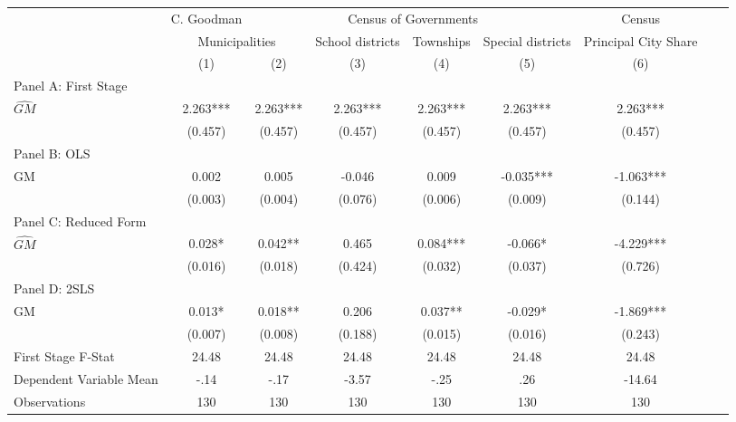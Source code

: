  \begin{tabular}{l*{8}{c}} \toprule
&\multicolumn{1}{c}{C. Goodman}&\multicolumn{4}{c}{Census of Governments}&\multicolumn{1}{c}{Census}\\\cmidrule(lr){2-2}\cmidrule(lr){3-6}\cmidrule(lr){7-7}
&\multicolumn{2}{c}{Municipalities}&\multicolumn{1}{c}{School districts}&\multicolumn{1}{c}{Townships}&\multicolumn{1}{c}{Special districts}&\multicolumn{1}{c}{Principal City Share}\\\cmidrule(lr){2-3}\cmidrule(lr){4-6}\cmidrule(lr){7-7}
&\multicolumn{1}{c}{(1)}&\multicolumn{1}{c}{(2)}&\multicolumn{1}{c}{(3)}&\multicolumn{1}{c}{(4)}&\multicolumn{1}{c}{(5)}&\multicolumn{1}{c}{(6)}\\
\cmidrule(lr){1-7}
\multicolumn{6}{l}{Panel A: First Stage}\\
\cmidrule(lr){1-7}
$\widehat{GM}$  &    2.263***&    2.263***&    2.263***&    2.263***&    2.263***&    2.263***\\
                &  (0.457)   &  (0.457)   &  (0.457)   &  (0.457)   &  (0.457)   &  (0.457)   \\
\cmidrule(lr){1-7}
\multicolumn{6}{l}{Panel B: OLS}\\
\cmidrule(lr){1-7}
GM              &    0.002   &    0.005   &   -0.046   &    0.009   &   -0.035***&   -1.063***\\
                &  (0.003)   &  (0.004)   &  (0.076)   &  (0.006)   &  (0.009)   &  (0.144)   \\
\cmidrule(lr){1-7}
\multicolumn{6}{l}{Panel C: Reduced Form}\\
\cmidrule(lr){1-7}
$\widehat{GM}$  &    0.028*  &    0.042** &    0.465   &    0.084***&   -0.066*  &   -4.229***\\
                &  (0.016)   &  (0.018)   &  (0.424)   &  (0.032)   &  (0.037)   &  (0.726)   \\
\cmidrule(lr){1-7}
\multicolumn{6}{l}{Panel D: 2SLS}\\
\cmidrule(lr){1-7}
GM              &    0.013*  &    0.018** &    0.206   &    0.037** &   -0.029*  &   -1.869***\\
                &  (0.007)   &  (0.008)   &  (0.188)   &  (0.015)   &  (0.016)   &  (0.243)   \\
\midrule
First Stage F-Stat&    24.48   &    24.48   &    24.48   &    24.48   &    24.48   &    24.48   \\
Dependent Variable Mean&     -.14   &     -.17   &    -3.57   &     -.25   &      .26   &   -14.64   \\
Observations    &      130   &      130   &      130   &      130   &      130   &      130   \\
       \bottomrule \end{tabular}
